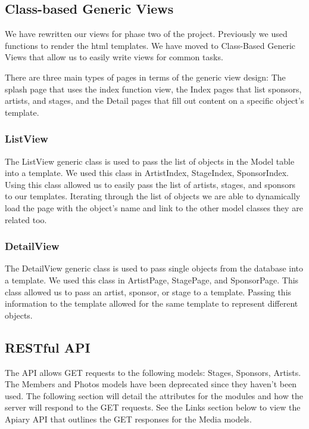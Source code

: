 \documentclass[12pt,english]{scrartcl}
\begin{document}
\subsection{Class-based Generic Views}
We have rewritten our views for phase two of the project. Previously we used functions to render the html templates. We have moved to Class-Based Generic Views
that allow us to easily write views for common tasks. 

There are three main types of pages in terms of the 
generic view design: The splash page that uses the index function view, the Index pages that list
sponsors, artists, and stages, and the Detail pages that fill out content on a specific object's 
template.

\subsubsection{ListView}
The ListView generic class is used to pass the list of objects in the Model table into a template. We used this class in ArtistIndex, StageIndex, SponsorIndex.
Using this class allowed us to easily pass the list of artists, stages, and sponsors to our templates. Iterating through the list of objects we are able to dynamically
load the page with the object's name and link to the other model classes they are related too.

\subsubsection{DetailView}

The DetailView generic class is used to pass single objects from the database into a template. We used this
class in ArtistPage, StagePage, and SponsorPage. This class allowed us to pass an artist, sponsor, or stage to a template. Passing this information to the template allowed for the same template to represent different objects.

\subsection{RESTful  API}

The API allows GET requests to the following models: Stages, Sponsors, Artists. The  Members and Photos models have been deprecated since they haven't been used.
The following section will detail the attributes for the modules and how the server will respond to the GET requests. See 
the Links section below to view the Apiary API that outlines the GET responses for the Media models.
\end{document}
